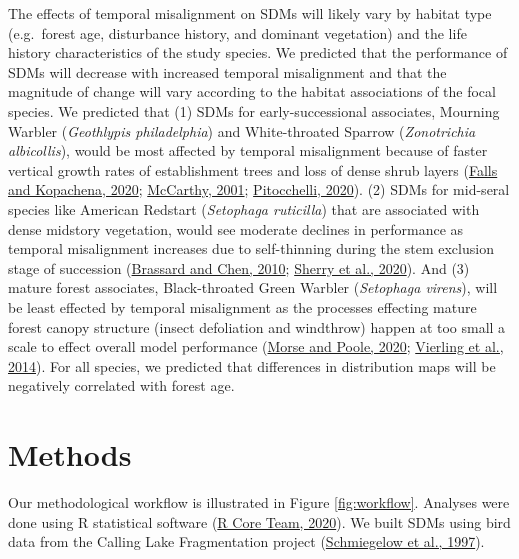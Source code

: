 \documentclass[
]{article}
\begin{document}
The effects of temporal misalignment on SDMs will likely vary by habitat type (e.g.~forest age, disturbance history, and dominant vegetation) and the life history characteristics of the study species. We predicted that the performance of SDMs will decrease with increased temporal misalignment and that the magnitude of change will vary according to the habitat associations of the focal species. We predicted that (1) SDMs for early-successional associates, Mourning Warbler (\emph{Geothlypis philadelphia}) and White-throated Sparrow (\emph{Zonotrichia albicollis}), would be most affected by temporal misalignment because of faster vertical growth rates of establishment trees and loss of dense shrub layers (\protect\hyperlink{ref-fallsWhitethroatedSparrowZonotrichia2020}{Falls and Kopachena, 2020}; \protect\hyperlink{ref-mccarthy2001gap}{McCarthy, 2001}; \protect\hyperlink{ref-pitocchelliMourningWarblerGeothlypis2020}{Pitocchelli, 2020}). (2) SDMs for mid-seral species like American Redstart (\emph{Setophaga ruticilla}) that are associated with dense midstory vegetation, would see moderate declines in performance as temporal misalignment increases due to self-thinning during the stem exclusion stage of succession (\protect\hyperlink{ref-brassardStandStructureComposition2010}{Brassard and Chen, 2010}; \protect\hyperlink{ref-sherryAmericanRedstartSetophaga2020a}{Sherry et al., 2020}). And (3) mature forest associates, Black-throated Green Warbler (\emph{Setophaga virens}), will be least effected by temporal misalignment as the processes effecting mature forest canopy structure (insect defoliation and windthrow) happen at too small a scale to effect overall model performance (\protect\hyperlink{ref-morseBlackthroatedGreenWarbler2020}{Morse and Poole, 2020}; \protect\hyperlink{ref-VierlingSwift2014}{Vierling et al., 2014}). For all species, we predicted that differences in distribution maps will be negatively correlated with forest age.

\hypertarget{methods}{%
\section{Methods}\label{methods}}

Our methodological workflow is illustrated in Figure \ref{fig:workflow}. Analyses were done using R statistical software (\protect\hyperlink{ref-R-base}{R Core Team, 2020}). We built SDMs using bird data from the Calling Lake Fragmentation project (\protect\hyperlink{ref-Schmiegelow1997}{Schmiegelow et al., 1997}).
\end{document}
